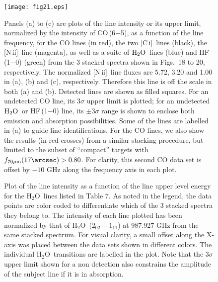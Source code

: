 \documentclass[preprint]{aastex}
\newcommand{\Water}{\mbox{${\rm H}_2{\rm O}$}}
\newcommand{\CI}{[C\,{\sc i}]}
\newcommand{\NII}{\mbox{[N\,{\sc ii}]}}
\newcommand{\water}{\mbox{H$_2$O}}
\begin{document}
\begin{figure}
\centering
\texttt{[image: fig21.eps]}
\vspace{-0.5in}
\caption{
Panels (a) to (c) are plots of the line intensity or its upper limit, normalized by 
the intensity of CO\,(6$-$5), as a function of the line frequency, for the CO lines (in red), 
the two \CI\ lines (black), the \NII\ line (magenta), as well as a suite of \Water\ lines 
(blue) and HF\,(1$-$0) (green) from the 3 stacked spectra shown in Figs.~18 to 20, respectively.  
The normalized \NII\ line fluxes are 5.72, 3.20 and 1.00 in (a), (b) and (c), respectively. 
Therefore this line is off the scale in both (a) and (b). Detected lines are shown as 
filled squares.  For an undetected CO line, its 3$\sigma$ upper limit is plotted; for 
an undetected \Water\ or HF\,(1$-$0) line, its $\pm$3$\sigma$ range is shown to enclose 
both emission and absorption possibilities.  Some of the lines are labelled in (a) to guide 
line identifications. 
For the CO lines, we also show the results (in red crosses) from a similar stacking 
procedure, but limited to the subset of ``compact'' targets with $f_{70\mu{\rm m}}(17\arcsec)
> 0.80$.  For clarity, this second CO data set is offset by $-10$ GHz along the frequency 
axis in each plot.
}
\label{Fig21}
\end{figure}
\clearpage







\begin{figure}
\centering
{}
\caption{
Plot of the line intensity as a function of the line upper level energy for the \water\ lines listed 
in Table 7.  As noted in the legend, the data points are color coded to differentiate which of 
the 3 stacked spectra they belong to.  The intensity of each line plotted has been normalized by that 
of \water\ ($2_{02}-1_{11}$) at 987.927 GHz from the same stacked spectrum.  For visual clarity, a small
offset along the X-axis was placed between the data sets shown in different colors.  The individual 
\water\ transitions are labelled in the plot. Note that the 3$\sigma$ upper limit shown for a non detection 
also constrains the amplitude of the subject line if it is in absorption.
}
\label{Fig22}
\end{figure}
\end{document}
